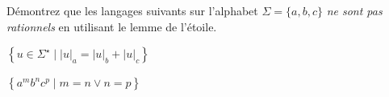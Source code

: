
\begingroup

\begin{exercice} \label{exo:lexing/expressiveness/pumping}

  Démontrez que les langages suivants sur l'alphabet $\Sigma = \{a, b, c\}$ \emph{ne sont pas rationnels} en utilisant le lemme de l'étoile.
  \begin{questions}
  \item $\left\{u \in \Sigma^\star \mid |u|_a = |u|_b + |u|_c \right\}$
  \item $\left\{a^m b^n c^p \mid m = n \lor n = p \right\}$
  \end{questions}

\end{exercice}

